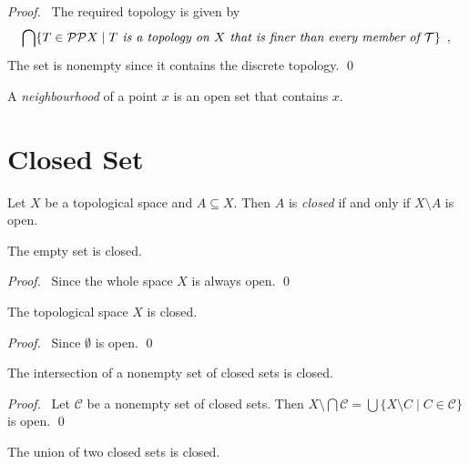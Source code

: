 \begin{proof}
    \pf\ The required topology is given by
    \[ \bigcap \{ T \in \mathcal{P} \mathcal{P} X \mid T \emph{ is a topology on $X$ that is
    finer than every member of $\mathcal{T}$} \} \enspace , \] 
    The set is nonempty since it contains the discrete topology. \qed
\end{proof}

\begin{definition}[Neighbourhood]
    A \emph{neighbourhood} of a point $x$ is an open set that contains $x$.
\end{definition}

\section{Closed Set}

\begin{definition}
    Let $X$ be a topological space and $A \subseteq X$. Then $A$ is \emph{closed} if and only if $X \setminus
    A$ is open.
\end{definition}

\begin{lemma}
    The empty set is closed.
\end{lemma}

\begin{proof}
    \pf\ Since the whole space $X$ is always open. \qed
\end{proof}

\begin{lemma}
    \label{lemma:closed_whole_set}
    The topological space $X$ is closed.
\end{lemma}

\begin{proof}
    \pf\ Since $\emptyset$ is open. \qed
\end{proof}

\begin{lemma}
    \label{lemma:closed_intersection}
    The intersection of a nonempty set of closed sets is closed.
\end{lemma}

\begin{proof}
    \pf\ Let $\mathcal{C}$ be a nonempty set of closed sets. Then $X \setminus \bigcap \mathcal{C}
    = \bigcup \{ X \setminus C \mid C \in \mathcal{C} \}$ is open. \qed
\end{proof}

\begin{lemma}
    \label{lemma:closed_union}
    The union of two closed sets is closed.
\end{lemma}

